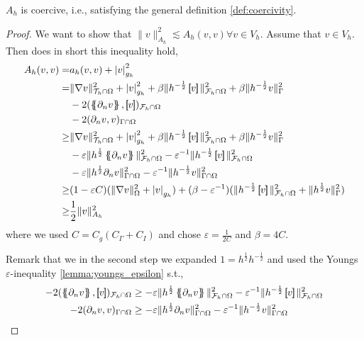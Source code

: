 \begin{lemma}
    $A_{h}$ is coercive, i.e., satisfying the general definition \ref{def:coercivity}.
\end{lemma}
\begin{proof}
We want to show that $  \| v \|_{A_{h}}^{2}   \lesssim A_{h}( v,v) \forall v \in V_{h} $.
    Assume that $v \in V_{h} $. Then does in short this inequality hold,
\[
    \begin{split}
A_{h}( v, v)   =& a_{h}( v, v) + \abs{ v }  _{g_{h}}^{2} \\
=&  \| \nabla v \|_{  \mathcal{T}_{h} \cap \Omega }^{ 2 } + \abs{v  }  _{ g_{h} }^{ 2 } + \beta \| h^{-\frac{1}{2}} \jump{ v }   \|_{\mathcal{F} _{h} \cap \Omega   }^{  2}   + \beta \| h^{-\frac{1}{2}}  v    \|_{ \Gamma}^{  2}
\\ & - 2( \mean{ \partial _{n} v  },  \jump{ v })_{\mathcal{F} _{h} \cap \Omega }
\\ & - 2 ( \partial _{n} v,v)_{\Gamma \cap \Omega }     \\
\ge  &  \| \nabla v \|_{  \mathcal{T}_{h} \cap \Omega }^{ 2 } + \left\lvert v \right\rvert_{ g_{h} }^{ 2 } + \beta \| h^{-\frac{1}{2}} \jump{ v }   \|_{\mathcal{F} _{h} \cap \Omega   }^{2  }   + \beta \| h^{-\frac{1}{2}}  v    \|_{ \Gamma}^{  2}
\\ & - \varepsilon \| h^{\frac{1}{2}}  \mean{  \partial _{n} v}      \|_{ \mathcal{F} _{h} \cap \Omega  }^{2  } - \varepsilon ^{-1} \| h^{-\frac{1}{2}} \jump{ v }   \|_{\mathcal{F} _{h} \cap \Omega   }^{ 2 }
\\ & - \varepsilon \| h^{\frac{1}{2}} \partial _{n} v \|_{ \Gamma \cap \Omega  }^{2  } -  \varepsilon ^{-1} \| h^{-\frac{1}{2}} v \|_{  \Gamma \cap  \Omega }^{ 2 } \\
\ge & ( 1-\varepsilon C)  ( \| \nabla v \|_{\Omega   }^{2  } + \left\lvert v \right\rvert _{g_{h}}   ) + ( \beta - \varepsilon ^{-1} ) ( \| h^{-\frac{1}{2}} \jump{ v }   \|_{ \mathcal{F} _{h}\cap  \Omega  }^{ 2 } + \| h^{\frac{1}{2}} v \|_{\Gamma
}^{  2}  )    \\
\ge & \frac{1}{2} \| v \|_{ A_{h} }^{ 2 }
    \end{split}
\]
where we used $C= C_{g} ( C_{\Gamma } + C_{I}) $ and chose $\varepsilon = \frac{1}{2C}$ and $\beta  = 4C$.

Remark that we in the second step we expanded $ 1 =  h^{\frac{1}{2}} h^{-\frac{1}{2}}$ and used the Youngs $\varepsilon $-inequality \ref{lemma:youngs_epsilon} s.t.,
 \[
     \begin{split}
         - 2( \mean{ \partial _{n} v  },  \jump{ v })_{\mathcal{F} _{h} \cap \Omega } &\ge - \varepsilon \| h^{\frac{1}{2}}  \mean{  \partial _{n} v}      \|_{ \mathcal{F} _{h} \cap \Omega  }^{2  }
  - \varepsilon ^{-1} \| h^{-\frac{1}{2}} \jump{ v }   \|_{\mathcal{F} _{h} \cap \Omega   }^{ 2 } \\
- 2 ( \partial _{n} v,v)_{\Gamma \cap \Omega }   &\ge- \varepsilon \| h^{\frac{1}{2}} \partial _{n} v \|_{ \Gamma \cap \Omega  }^{2  }
-  \varepsilon ^{-1} \| h^{-\frac{1}{2}} v \|_{  \Gamma \cap  \Omega }^{ 2 }
     \end{split}
 \]


\end{proof}

